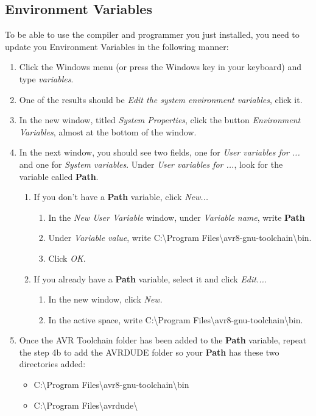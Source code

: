 \documentclass[10pt,letterpaper]{article}
\begin{document}
\subsection{Environment Variables}
To be able to use the compiler and programmer you just installed, you need to update you Environment Variables in the following manner:
\begin{enumerate}
    \item Click the Windows menu (or press the Windows key in your keyboard) and type \textit{variables}.
    \item One of the results should be \textit{Edit the system environment variables}, click it.
    \item In the new window, titled \textit{System Properties}, click the button \textit{Environment Variables}, almost at the bottom of the window.
    \item In the next window, you should see two fields, one for \textit{User variables for ...} and one for \textit{System variables}. Under \textit{User variables for ...}, look for the variable called \textbf{Path}.
    \begin{enumerate}
        \item If you don't have a \textbf{Path} variable, click \textit{New...} 
        \begin{enumerate}
            \item In the \textit{New User Variable} window, under \textit{Variable name}, write \textbf{Path}
            \item Under \textit{Variable value}, write {\color{ForestGreen}C:\textbackslash Program Files\textbackslash avr8-gnu-toolchain\textbackslash bin}.
            \item Click \textit{OK}.
        \end{enumerate}
        \item If you already have a \textbf{Path} variable, select it and click \textit{Edit...}. 
        \begin{enumerate}
            \item In the new window, click \textit{New}.
            \item In the active space, write {\color{ForestGreen}C:\textbackslash Program Files\textbackslash avr8-gnu-toolchain\textbackslash bin}.
        \end{enumerate}
    \end{enumerate}
    \item Once the AVR Toolchain folder has been added to the \textbf{Path} variable, repeat the step 4b to add the AVRDUDE folder so your \textbf{Path} has these two directories added:
    \begin{itemize}
        \item {\color{ForestGreen}C:\textbackslash Program Files\textbackslash avr8-gnu-toolchain\textbackslash bin}
        \item {\color{ForestGreen}C:\textbackslash Program Files\textbackslash avrdude\textbackslash}
    \end{itemize}
\end{enumerate}
\end{document}
